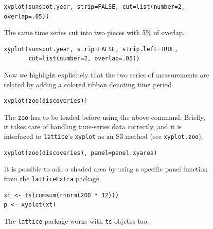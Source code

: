 \documentclass[a4paper,twoside]{book}
\newcounter{fig}
\newcommand{\img}[1]{\texttt{[image: \#1]}\stepcounter{fig}}
\renewcommand{\texttt}[1]{\lstinline{#1}}
\begin{document}
\begin{figure}[H]
\begin{lstlisting}
xyplot(sunspot.year, strip=FALSE, cut=list(number=2, overlap=.05))
\end{lstlisting}
  \fcapside[\FBwidth] {\img{figs_lattice-crop}}
  {\caption*{The same time series cut into two pieces with 5\% of overlap.}}
\end{figure}

\begin{figure}[H]
\begin{lstlisting}
xyplot(sunspot.year, strip=FALSE, strip.left=TRUE, 
       cut=list(number=2, overlap=.05))
\end{lstlisting}
  \fcapside[\FBwidth] {\img{figs_lattice-crop}}
  {\caption*{Now we highlight explicitely that the two series of
      measurements are related by adding a colored ribbon denoting
      time period.}}
\end{figure}

\begin{figure}[H]
\begin{lstlisting}
xyplot(zoo(discoveries))
\end{lstlisting}
  \fcapside[\FBwidth] {\img{figs_lattice-crop}}
  {\caption*{ The \texttt{zoo} has to be loaded before using the
      above command. Briefly, it takes care of handling time-series
      data correctly, and it is interfaced to \texttt{lattice}'s
      \texttt{xyplot} as an S3 method (see \texttt{xyplot.zoo}).}}
\end{figure}


\begin{figure}[H]
\begin{lstlisting}
xyplot(zoo(discoveries), panel=panel.xyarea)
\end{lstlisting}
  \fcapside[\FBwidth] {\img{figs_lattice-crop}}
  {\caption*{It is possible to add a shaded area by using a specific
      panel function from the \texttt{latticeExtra} package.}}
\end{figure}

\begin{figure}[H]
\begin{lstlisting}
xt <- ts(cumsum(rnorm(200 * 12)))
p <- xyplot(xt)
\end{lstlisting}
  \fcapside[\FBwidth] {\img{figs_lattice-crop}}
  {\caption*{The \texttt{lattice} package works with \texttt{ts}
      objetcs too.}}
\end{figure}
\end{document}
